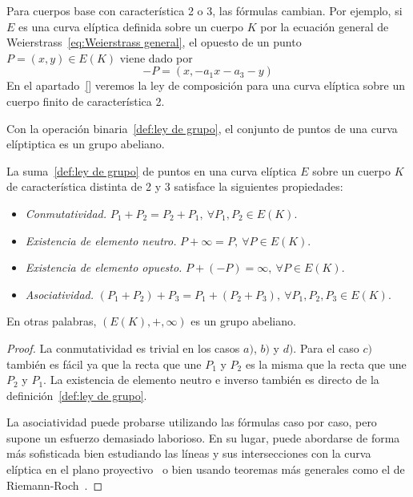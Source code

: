 \begin{nota}
	Para cuerpos base con característica 2 o 3, las fórmulas cambian. Por ejemplo, si $E$ es una curva elíptica definida sobre un cuerpo $K$ por la ecuación general de Weierstrass~\eqref{eq:Weierstrass general}, el opuesto de un punto $P = (x, y) \in E(K)$ viene dado por
	$$
		- P = (x, -a_1 x - a_3 - y)
	$$
	En el apartado~\ref{} veremos la ley de composición para una curva elíptica sobre un cuerpo finito de característica 2.
\end{nota}

Con la operación binaria~\ref{def:ley de grupo}, el conjunto de puntos de una curva elíptiptica es un grupo abeliano.

\begin{teorema}\label{th:grupo abeliano}
	La suma~\ref{def:ley de grupo} de puntos en una curva elíptica $E$ sobre un cuerpo $K$ de característica distinta de 2 y 3 satisface la siguientes propiedades:
	\begin{itemize}
		\item \emph{Conmutatividad.} $P_1 + P_2 = P_2 + P_1,\ \forall P_1, P_2 \in E(K)$.
		\item \emph{Existencia de elemento neutro.} $P + \infty = P,\ \forall P \in E(K)$.
		\item \emph{Existencia de elemento opuesto.} $P + (-P) = \infty,\ \forall P \in E(K)$.
		\item \emph{Asociatividad.} $(P_1 + P_2) + P_3 = P_1 + (P_2 + P_3),\ \forall P_1, P_2, P_3 \in E(K)$.
	\end{itemize}
	En otras palabras, $(E(K), +, \infty)$ es un grupo abeliano.
\end{teorema}
\begin{proof}
La conmutatividad es trivial en los casos $a)$, $b)$ y $d)$. Para el caso $c)$ también es fácil ya que la recta que une $P_1$ y $P_2$ es la misma que la recta que une $P_2$ y $P_1$. La existencia de elemento neutro e inverso también es directo de la definición~\ref{def:ley de grupo}.

La asociatividad puede probarse utilizando las fórmulas caso por caso, pero supone un esfuerzo demasiado laborioso. En su lugar, puede abordarse de forma más sofisticada bien estudiando las líneas y sus intersecciones con la curva elíptica en el plano proyectivo~\cite[sec. 2.4]{Washington:2008} o bien usando teoremas más generales como el de Riemann-Roch~\cite[teo. III.3.4.e]{Silverman:2009}.
\end{proof}

